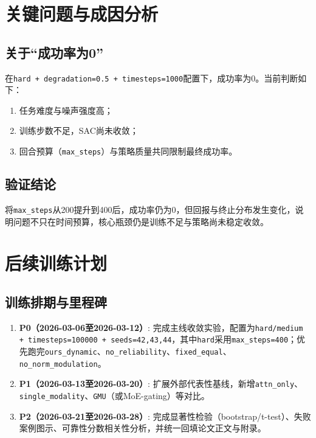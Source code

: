 \section{关键问题与成因分析}
\subsection{关于“成功率为0”}
在\texttt{hard + degradation=0.5 + timesteps=1000}配置下，成功率为0。当前判断如下：
\begin{enumerate}
    \item 任务难度与噪声强度高；
    \item 训练步数不足，SAC尚未收敛；
    \item 回合预算（\texttt{max\_steps}）与策略质量共同限制最终成功率。
\end{enumerate}

\subsection{验证结论}
将\texttt{max\_steps}从200提升到400后，成功率仍为0，但回报与终止分布发生变化，说明问题不只在时间预算，核心瓶颈仍是训练不足与策略尚未稳定收敛。

\section{后续训练计划}
\subsection{训练排期与里程碑}
\begin{enumerate}
    \item \textbf{P0（2026-03-06至2026-03-12）}: 完成主线收敛实验，配置为\texttt{hard/medium + timesteps=100000 + seeds=42,43,44}，其中\texttt{hard}采用\texttt{max\_steps=400}；优先跑完\texttt{ours\_dynamic}、\texttt{no\_reliability}、\texttt{fixed\_equal}、\texttt{no\_norm\_modulation}。
    \item \textbf{P1（2026-03-13至2026-03-20）}: 扩展外部代表性基线，新增\texttt{attn\_only}、\texttt{single\_modality}、\texttt{GMU}（或MoE-gating）等对比。
    \item \textbf{P2（2026-03-21至2026-03-28）}: 完成显著性检验（bootstrap/t-test）、失败案例图示、可靠性分数相关性分析，并统一回填论文正文与附录。
\end{enumerate}

